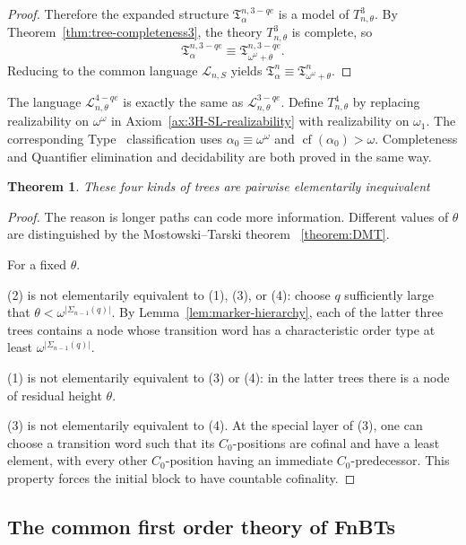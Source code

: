 \documentclass{amsart}
\newcommand{\cf}{\operatorname{cf}}
\newtheorem{theorem}{Theorem}
\theoremstyle{definition}
\begin{document}
\begin{proof}
    Therefore the expanded structure $\mathfrak{T}_\alpha^{n,3-qe}$ is a model of $T_{n,\theta}^3$. By Theorem~\ref{thm:tree-completeness3}, the theory $T_{n,\theta}^3$ is complete, so
    $$\mathfrak{T}_\alpha^{n,3-qe}\equiv\mathfrak{T}_{\omega^\omega+\theta}^{n,3-qe}.$$
    Reducing to the common language $\mathcal{L}_{n,S}$ yields $\mathfrak{T}_\alpha^n\equiv\mathfrak{T}_{\omega^\omega+\theta}^n$.
\end{proof}

The language $\mathcal{L}_{n,\theta}^{4-qe}$ is exactly the same as $\mathcal{L}_{n,\theta}^{3-qe}$.  Define $T_{n,\theta}^4$ by replacing realizability on $\omega^\omega$ in Axiom~\ref{ax:3H-SL-realizability} with realizability on $\omega_1$. The corresponding Type~\MakeUppercase{} classification uses $\alpha_0\equiv\omega^\omega$ and $\cf(\alpha_0)>\omega$.  Completeness \MakeUppercase{} and Quantifier elimination and decidability \MakeUppercase{} are both proved in the same way.

\begin{theorem}\label{theorem:inequivalent}
  These four kinds of trees are pairwise elementarily inequivalent
\end{theorem}
\begin{proof}

  The reason is longer paths can code more information. Different values of $\theta$ are distinguished by the Mostowski--Tarski theorem ~\ref{theorem:DMT}.

  For a fixed $\theta$.

  (2) is not elementarily equivalent to (1), (3), or (4): choose $q$ sufficiently large that $\theta<\omega^{|\Sigma_{n-1}(q)|}$. By Lemma~\ref{lem:marker-hierarchy}, each of the latter three trees contains a node whose transition word has a characteristic order type at least $\omega^{|\Sigma_{n-1}(q)|}$.

  (1) is not elementarily equivalent to (3) or (4): in the latter trees there is a node of residual height $\theta$.

  (3) is not elementarily equivalent to (4). At the special layer of (3), one can choose a transition word such that its $C_0$-positions are cofinal and have a least element, with every other $C_0$-position having an immediate $C_0$-predecessor. This property forces the initial block to have countable cofinality.

\end{proof}

\subsection{The common first order theory of FnBTs}
\end{document}
